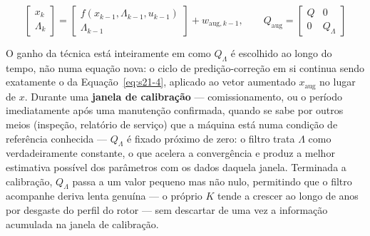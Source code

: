 \documentclass[12pt,a4paper]{article}
\numberwithin{equation}{section}
\numberwithin{table}{section}
\numberwithin{figure}{section}
\begin{document}
\begin{equation}\label{eq:s28-2}
\begin{bmatrix} x_k \\ \Lambda_k \end{bmatrix} = \begin{bmatrix} f(x_{k-1}, \Lambda_{k-1}, u_{k-1}) \\ \Lambda_{k-1} \end{bmatrix} + w_{\text{aug},k-1}, \qquad Q_{\text{aug}} = \begin{bmatrix} Q & 0 \\ 0 & Q_\Lambda \end{bmatrix}
\end{equation}

O ganho da técnica está inteiramente em como $Q_\Lambda$ é escolhido ao longo do tempo, não numa equação nova: o ciclo de predição-correção em si continua sendo exatamente o da Equação~\eqref{eq:s21-4}, aplicado ao vetor aumentado $x_{\text{aug}}$ no lugar de $x$. Durante uma \textbf{janela de calibração} — comissionamento, ou o período imediatamente após uma manutenção confirmada, quando se sabe por outros meios (inspeção, relatório de serviço) que a máquina está numa condição de referência conhecida — $Q_\Lambda$ é fixado próximo de zero: o filtro trata $\Lambda$ como verdadeiramente constante, o que acelera a convergência e produz a melhor estimativa possível dos parâmetros com os dados daquela janela. Terminada a calibração, $Q_\Lambda$ passa a um valor pequeno mas não nulo, permitindo que o filtro acompanhe deriva lenta genuína — o próprio $K$ tende a crescer ao longo de anos por desgaste do perfil do rotor — sem descartar de uma vez a informação acumulada na janela de calibração.
\end{document}
